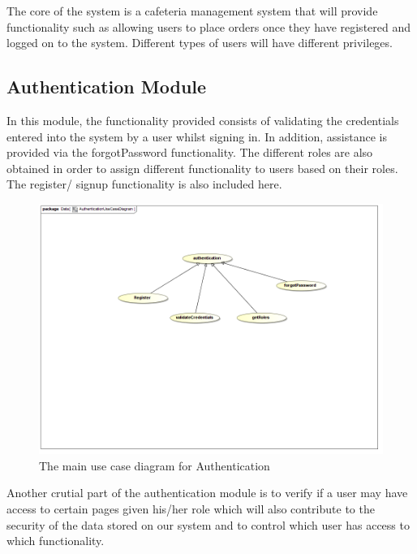 \documentclass[a4paper,12pt]{report}
\begin{document}
The core of the system is a cafeteria management system that will provide functionality such as allowing users to place orders once they have registered and logged on to the system. Different types of users will have different privileges. 

\subsection{Authentication Module}

In this module, the functionality provided consists of validating the credentials entered into the system by a user whilst signing in. In addition, assistance is provided via the forgotPassword functionality. The different roles are also obtained in order to assign different functionality to users based on their roles. The register/ signup functionality is also included here. 

\begin{figure}[H]
  \centering
    \includegraphics[width=1.0\textwidth]{../images/AuthenticationUseCaseDiagram.png}
    \caption{The main use case diagram for Authentication} 
\end{figure}

Another crutial part of the authentication module is to verify if a user may have access to certain pages given his/her role which will also contribute to the security of the data stored on our system and to control which user has access to which functionality.
\end{document}
